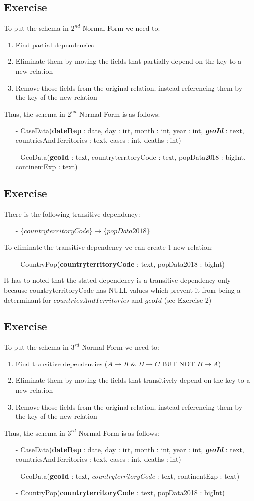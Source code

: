 \documentclass{article}
\newcounter{ex}
\newcommand{\exercise}{
\stepcounter{ex}
\subsection{Exercise \arabic{ex}}
}
\begin{document}
\exercise
To put the schema in $2^{nd}$ Normal Form we need to:
\begin{enumerate}
    \item Find partial dependencies
    \item Eliminate them by moving the fields that partially depend on the key to a new relation
    \item Remove those fields from the original relation, instead referencing them by the key of the new relation
\end{enumerate}
Thus, the schema in $2^{nd}$ Normal Form is as follows:
\begin{itemize}
    \item[-] CaseData(\textbf{dateRep} : date, day : int, month : int, year : int, \textbf{\textit{geoId}} : text, countriesAndTerritories : text, cases : int, deaths : int)
    \item[-] GeoData(\textbf{geoId} : text, countryterritoryCode : text, popData2018 : bigInt, continentExp : text)
\end{itemize}

\exercise
There is the following transitive dependency:
\begin{itemize}
    \item[-] $\{ countryterritoryCode \} \rightarrow \{ popData2018 \}$
\end{itemize}
To eliminate the transitive dependency we can create 1 new relation:
\begin{itemize}
    \item[-] CountryPop(\textbf{countryterritoryCode} : text, popData2018 : bigInt)
\end{itemize}
It has to noted that the stated dependency is a transitive dependency only because countryterritoryCode has NULL values which prevent it from being a determinant for $countriesAndTerritories$ and $geoId$ (see Exercise 2).

\exercise
To put the schema in $3^{rd}$ Normal Form we need to:
\begin{enumerate}
    \item Find transitive dependencies ($A \rightarrow B$ \& $B \rightarrow C$ BUT NOT $B \rightarrow A$) 
    \item Eliminate them by moving the fields that transitively depend on the key to a new relation
    \item Remove those fields from the original relation, instead referencing them by the key of the new relation
\end{enumerate}
Thus, the schema in $3^{rd}$ Normal Form is as follows:
\begin{itemize}
    \item[-] CaseData(\textbf{dateRep} : date, day : int, month : int, year : int, \textbf{\textit{geoId}} : text, countriesAndTerritories : text, cases : int, deaths : int)
    \item[-] GeoData(\textbf{geoId} : text, \textit{countryterritoryCode} : text, continentExp : text)
    \item[-] CountryPop(\textbf{countryterritoryCode} : text, popData2018 : bigInt)
\end{itemize}
\end{document}

